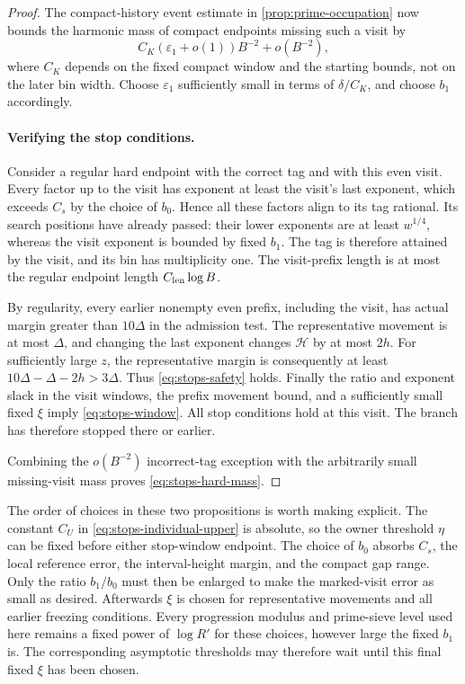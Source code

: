 \begin{proof}
The compact-history event estimate in \cref{prop:prime-occupation}
now bounds the harmonic mass of compact endpoints missing such a visit
by
\[
 C_K(\varepsilon_1+o(1))B^{-2}+o(B^{-2}),
\]
where $C_K$ depends on the fixed compact window and the starting bounds,
not on the later bin width.  Choose $\varepsilon_1$ sufficiently small
in terms of $\delta/C_K$, and choose $b_1$ accordingly.

\paragraph{Verifying the stop conditions.}
Consider a regular hard endpoint with the correct tag and with this
even visit.  Every factor up to the visit has exponent at least the
visit's last exponent, which exceeds $C_s$ by the choice of $b_0$.
Hence all these factors align to its tag rational.  Its search
positions have already passed: their lower exponents are at least
$w^{1/4}$, whereas the visit exponent is bounded by fixed $b_1$.
The tag is therefore attained by the visit, and its bin has multiplicity
one.  The visit-prefix length is at most the regular endpoint length
$C_{\rm len}\log B$.

By regularity, every earlier nonempty even prefix, including the visit,
has actual margin greater than $10\Delta$ in the admission test.
The representative movement is at most $\Delta$, and changing the
last exponent changes $\mathcal H$ by at most $2h$.  For sufficiently large
$z$, the representative margin is consequently at least
$10\Delta-\Delta-2h>3\Delta$.  Thus
\eqref{eq:stops-safety} holds.  Finally the ratio and exponent slack
in the visit windows, the prefix movement bound, and a sufficiently
small fixed $\xi$ imply \eqref{eq:stops-window}.  All stop conditions
hold at this visit.  The branch has therefore stopped there or earlier.

Combining the $o(B^{-2})$ incorrect-tag exception with the arbitrarily
small missing-visit mass proves \eqref{eq:stops-hard-mass}.
\end{proof}

The order of choices in these two propositions is worth making
explicit.  The constant $C_U$ in
\eqref{eq:stops-individual-upper} is absolute, so the owner threshold
$\eta$ can be fixed before either stop-window endpoint.  The choice
of $b_0$ absorbs $C_s$, the local reference error, the interval-height
margin, and the compact gap range.  Only the ratio $b_1/b_0$ must then
be enlarged to make the marked-visit error as small as desired.
Afterwards $\xi$ is chosen for representative movements and all earlier
freezing conditions.  Every progression modulus and prime-sieve level
used here remains a fixed power of $\log R'$ for these choices, however
large the fixed $b_1$ is.  The corresponding asymptotic thresholds may
therefore wait until this final fixed $\xi$ has been chosen.
